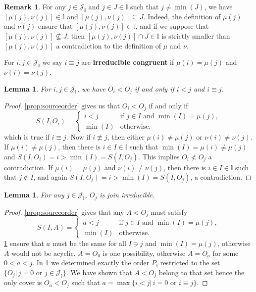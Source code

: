 \documentclass[reqno]{amsart}
\newtheorem{lemma}[theorem]{Lemma}
\theoremstyle{definition}
\newtheorem{remark}[theorem]{Remark}
\newcommand{\defn}[1]{\textbf{\textsf{\color{PineGreen} #1}}} %
\newcommand{\II}{\mathbb I} %
\newcommand{\cJ}{\mathcal J} %
\begin{document}
\begin{remark}
\label{rem:munuseg}
For any $j\in \cJ_\II$ and $j\in J\in \II$ such that $j\ne\min(J)$, we have $[\mu(j),\nu(j)]\in \II$ and $[\mu(j),\nu(j)]\subseteq J$.
Indeed, the definition of $\mu(j)$ and $\nu(j)$ ensure that $[\mu(j),\nu(j)]\in \II$, and if we suppose that $[\mu(j),\nu(j)]\not\subseteq J$, then $[\mu(j),\nu(j)]\cap J\in \II$ is strictly smaller than $[\mu(j),\nu(j)]$ a contradiction to the definition of $\mu$ and $\nu$.
\end{remark}

For $i,j\in \cJ_\II$ we say $i\equiv j$ are \defn{irreducible congruent} if $\mu(i)=\mu(j)$ and $\nu(i)=\nu(j)$.

\begin{lemma} \label{lem:irrorder}
 For $i,j\in \cJ_\II$, we have $O_i<O_j$ if and only if $i<j$ and $i\equiv j$.
\end{lemma}

\begin{proof}
\cref{prop:sourceorder} gives us that $O_i<O_j$ if and only if
\[
S(I,O_i)=\begin{cases}
	i<j & \text{if $j\in I$ and $\min(I)=\mu(j)$},\\
	\min(I)& \text{otherwise.}
\end{cases}
\]
which is true if $i\equiv j$.
Now if $i\not\equiv j$, then either $\mu(i)\ne \mu(j)$  or  $\nu(i)\ne \nu(j)$.
If $\mu(i)\ne\mu(j)$, then there is $i\in I\in \II$ such that $\min(I)=\mu(i)\ne\mu(j)$ and $S(I,O_i)=i>\min(I)=S(I,O_j)$.
This implies $O_i\not<O_j$ a contradiction.
If $\mu(i)= \mu(j)$  and  $\nu(i)\ne \nu(j)$, then there is $i\in I\in \II$ such that $j\not\in I$, and again $S(I,O_i)=i>\min(I)=S(I,O_j)$, a contradiction.
\end{proof}

\begin{lemma}
\label{lem:irrOj}
	For any $j\in \cJ_\II$, $O_j$ is join irreducible.
\end{lemma}

\begin{proof}
\cref{prop:sourceorder} gives that any $A<O_j$ must satisfy
\[
S(I,A)=\begin{cases}
	a<j & \text{if $j\in I$ and $\min(I)=\mu(j)$},\\
	\min(I)& \text{otherwise.}
\end{cases}
\]
\cref{rem:munuseg} ensure that $a$ must be the same for all $I\ni j$ and $\min(I)=\mu(j)$, otherwise $A$ would not be acyclic.
$A=O_0$ is one possibility, otherwise $A=O_a$ for some $0<a<j$.
In \cref{lem:irrorder} we determined exactly the order $P_\II$ restricted
to the set $\{ O_j |\, j=0 \text{ or } j\in \cJ_\II\}$.
We have shown  that $A<O_j$ belong to that set hence the only cover is $O_a<O_j$
such that $a=\max\{ i<j|\, i=0 \text{ or } i\equiv j\}$.
\end{proof}
\end{document}
